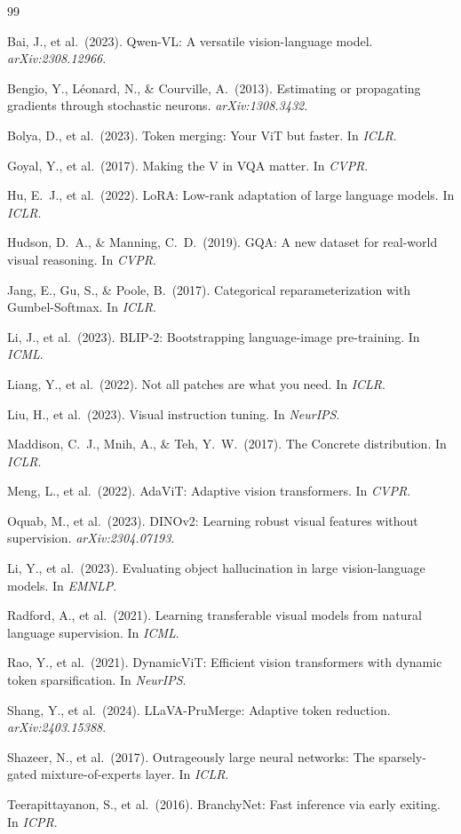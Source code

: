 \documentclass[11pt,a4paper]{article}
\begin{document}
\begin{thebibliography}{99}

Bai, J., et al.\ (2023).
Qwen-VL: A versatile vision-language model.
\emph{arXiv:2308.12966}.

Bengio, Y., L\'{e}onard, N., \& Courville, A.\ (2013).
Estimating or propagating gradients through stochastic neurons.
\emph{arXiv:1308.3432}.

Bolya, D., et al.\ (2023).
Token merging: Your ViT but faster.
In \emph{ICLR}.

Goyal, Y., et al.\ (2017).
Making the V in VQA matter.
In \emph{CVPR}.

Hu, E.~J., et al.\ (2022).
LoRA: Low-rank adaptation of large language models.
In \emph{ICLR}.

Hudson, D.~A., \& Manning, C.~D.\ (2019).
GQA: A new dataset for real-world visual reasoning.
In \emph{CVPR}.

Jang, E., Gu, S., \& Poole, B.\ (2017).
Categorical reparameterization with Gumbel-Softmax.
In \emph{ICLR}.

Li, J., et al.\ (2023).
BLIP-2: Bootstrapping language-image pre-training.
In \emph{ICML}.

Liang, Y., et al.\ (2022).
Not all patches are what you need.
In \emph{ICLR}.

Liu, H., et al.\ (2023).
Visual instruction tuning.
In \emph{NeurIPS}.

Maddison, C.~J., Mnih, A., \& Teh, Y.~W.\ (2017).
The Concrete distribution.
In \emph{ICLR}.

Meng, L., et al.\ (2022).
AdaViT: Adaptive vision transformers.
In \emph{CVPR}.

Oquab, M., et al.\ (2023).
DINOv2: Learning robust visual features without supervision.
\emph{arXiv:2304.07193}.

Li, Y., et al.\ (2023).
Evaluating object hallucination in large vision-language models.
In \emph{EMNLP}.

Radford, A., et al.\ (2021).
Learning transferable visual models from natural language supervision.
In \emph{ICML}.

Rao, Y., et al.\ (2021).
DynamicViT: Efficient vision transformers with dynamic token
sparsification.
In \emph{NeurIPS}.

Shang, Y., et al.\ (2024).
LLaVA-PruMerge: Adaptive token reduction.
\emph{arXiv:2403.15388}.

Shazeer, N., et al.\ (2017).
Outrageously large neural networks: The sparsely-gated
mixture-of-experts layer.
In \emph{ICLR}.

Teerapittayanon, S., et al.\ (2016).
BranchyNet: Fast inference via early exiting.
In \emph{ICPR}.

\end{thebibliography}
\end{document}
